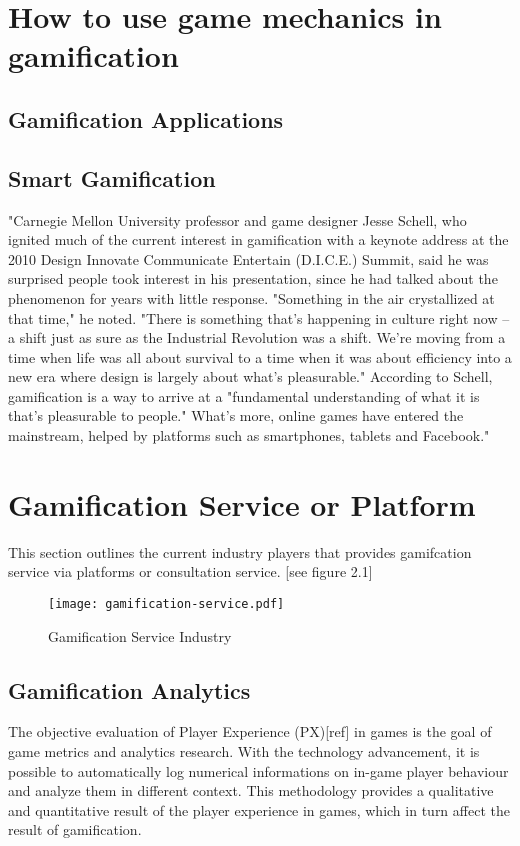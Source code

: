 \section{How to use game mechanics in gamification}

\subsection{Gamification Applications}

\subsection{Smart Gamification}
"Carnegie Mellon University professor and game designer Jesse Schell, who ignited much of the current interest in gamification with a keynote address at the 2010 Design Innovate Communicate Entertain (D.I.C.E.) Summit, said he was surprised people took interest in his presentation, since he had talked about the phenomenon for years with little response. "Something in the air crystallized at that time," he noted. "There is something that's happening in culture right now -- a shift just as sure as the Industrial Revolution was a shift. We're moving from a time when life was all about survival to a time when it was about efficiency into a new era where design is largely about what's pleasurable." According to Schell, gamification is a way to arrive at a "fundamental understanding of what it is that's pleasurable to people." What's more, online games have entered the mainstream, helped by platforms such as smartphones, tablets and Facebook."

\section{Gamification Service or Platform}
This section outlines the current industry players that provides gamifcation service via platforms or consultation service. [see figure 2.1]

\begin{figure}[ht]
	\centering
		\texttt{[image: gamification-service.pdf]}
		\caption{Gamification Service Industry}
		\label{fig:gamification-service}
\end{figure}


\subsection{Gamification Analytics}
The objective evaluation of Player Experience (PX)[ref] in games is the goal of game metrics and analytics research. With the technology advancement, it is possible to automatically log numerical informations on in-game player behaviour and analyze them in different context. This methodology provides a qualitative and quantitative result of the player experience in games, which in turn affect the result of gamification.



